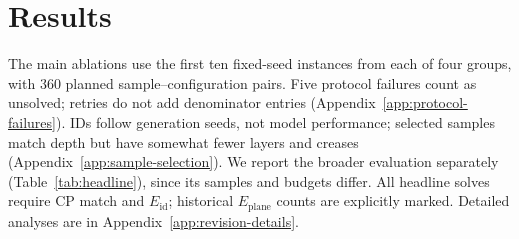 \section{Results}
\label{sec:results}
\label{sec:results-headline}
The main ablations use the first ten fixed-seed instances from each of four groups,
with 360 planned sample--configuration pairs. Five protocol failures count as unsolved;
retries do not add denominator entries (Appendix~\ref{app:protocol-failures}). IDs follow
generation seeds, not model performance; selected samples match depth but have somewhat
fewer layers and creases (Appendix~\ref{app:sample-selection}). We report
the broader evaluation separately (Table~\ref{tab:headline}), since its samples and
budgets differ. All headline solves require CP match and $E_{\mathrm{id}}$; historical
$E_{\mathrm{plane}}$ counts are explicitly marked. Detailed analyses are in
Appendix~\ref{app:revision-details}.

